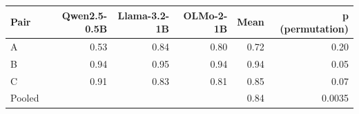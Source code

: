 \begin{tabular}{lrrrrr}
\toprule
Pair & Qwen2.5-0.5B & Llama-3.2-1B & OLMo-2-1B & Mean & p (permutation) \\
\midrule
A & 0.53 & 0.84 & 0.80 & 0.72 & 0.20 \\
B & 0.94 & 0.95 & 0.94 & 0.94 & 0.05 \\
C & 0.91 & 0.83 & 0.81 & 0.85 & 0.07 \\
\midrule
Pooled &  &  &  & 0.84 & 0.0035 \\
\bottomrule
\end{tabular}
